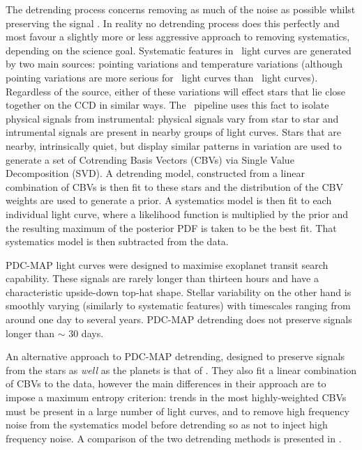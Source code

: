 The detrending process concerns removing as much of the noise as possible
whilst preserving the signal \citep{Smith2012, Stumpe2012}.
In reality no detrending process does this perfectly and most favour a
slightly more or less aggressive approach to removing systematics, depending
on the science goal.
Systematic features in \kepler\ light curves are generated by two main
sources: pointing variations and temperature variations (although pointing
variations are more serious for \ktwo\ light curves than \kepler\ light
curves).
Regardless of the source, either of these variations will effect stars that
lie close together on the CCD in similar ways.
The \kepler\ pipeline uses this fact to isolate physical signals from
instrumental: physical signals vary from star to star and intrumental signals
are present in nearby groups of light curves.
Stars that are nearby, intrinsically quiet, but display similar patterns in
variation are used to generate a set of Cotrending Basis Vectors (CBVs) via
Single Value Decomposition (SVD).
A detrending model, constructed from a linear combination of CBVs is then fit
to these stars and the distribution of the CBV weights are used to generate a
prior.
A systematics model is then fit to each individual light curve, where a
likelihood function is multiplied by the prior and the resulting maximum of
the posterior PDF is taken to be the best fit.
That systematics model is then subtracted from the data.

PDC-MAP light curves were designed to maximise exoplanet transit search
capability.
These signals are rarely longer than thirteen hours and have a characteristic
upside-down top-hat shape.
Stellar variability on the other hand is smoothly varying (similarly to
systematic features) with timescales ranging from around one day to several
years.
PDC-MAP detrending does not preserve signals longer than $\sim$ 30 days.

An alternative approach to PDC-MAP detrending, designed to preserve signals
from the stars as {\it well} as the planets is that of \citet{Roberts2013}.
They also fit a linear combination of CBVs to the data, however the main
differences in their approach are to impose a maximum entropy criterion:
trends in the most highly-weighted CBVs must be present in a large number of
light curves, and to remove high frequency noise from the systematics model
before detrending so as not to inject high frequency noise.
A comparison of the two detrending methods is presented in
\citet{Roberts2013}.


